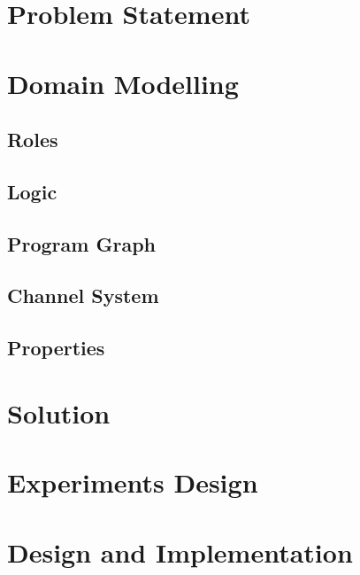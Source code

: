 \section {Problem Statement}
\label{sec:problem}


\section{Domain Modelling}
\label{sec:modelling}


\subsection{Roles}
\label{sec:roles}


\subsection{Logic}
\label{sec:logic}


\subsection{Program Graph}
\label{sec:pg}


\subsection{Channel System}
\label{sec:cs}


\subsection{Properties}
\label{sec:properties}


\section{Solution}
\label{sec:solution}


\section{Experiments Design}
\label{sec:experiment}


\section{Design and Implementation}
\label{sec:impl}


